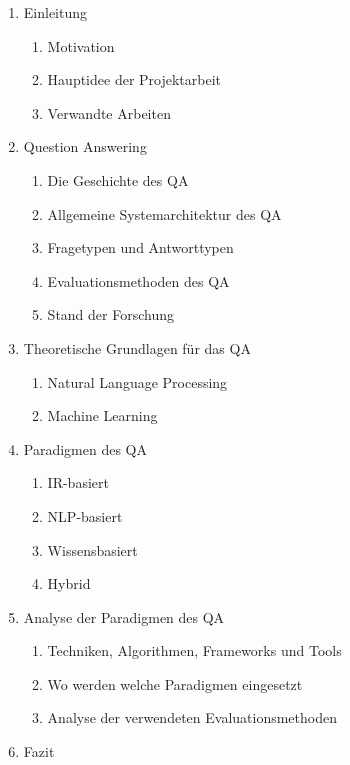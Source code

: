 \documentclass[
        ngerman,
        paper=a4,
        numbers=noendperiod,
]{scrreprt}
\begin{document}
\renewcommand{\labelenumii}{\theenumii}
\renewcommand{\theenumii}{\theenumi.\arabic{enumii}.}

\begin{enumerate}

\item Einleitung
    \begin{enumerate}
    \item Motivation
    \item Hauptidee der Projektarbeit
    \item Verwandte Arbeiten
  \end{enumerate}
  
  
\item Question Answering
    \begin{enumerate}
    \item Die Geschichte des QA
    \item Allgemeine Systemarchitektur des QA
    \item Fragetypen und Antworttypen
    \item Evaluationsmethoden des QA
    \item Stand der Forschung
  \end{enumerate}
  
\item Theoretische Grundlagen für das QA
    \begin{enumerate}
    \item Natural Language Processing
    \item Machine Learning
  \end{enumerate}
  
\item Paradigmen des QA
    \begin{enumerate}
    \item IR-basiert
    \item NLP-basiert
    \item Wissensbasiert
    \item Hybrid
  \end{enumerate}

\item Analyse der Paradigmen des QA
    \begin{enumerate}
    \item Techniken, Algorithmen, Frameworks und Tools 
    \item Wo werden welche Paradigmen eingesetzt
    \item Analyse der verwendeten Evaluationsmethoden 
  \end{enumerate}
  
\item Fazit
  
  
  
\end{enumerate}
\end{document}
